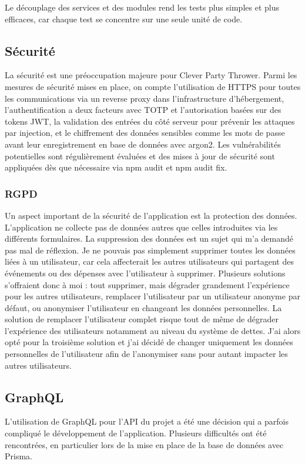 Le découplage des services et des modules rend les tests plus simples et plus efficaces, car chaque test se concentre sur une seule unité de code.

\subsection{Sécurité}\label{subsec:securite}
La sécurité est une préoccupation majeure pour Clever Party Thrower.
Parmi les mesures de sécurité mises en place, on compte l'utilisation de HTTPS pour toutes les communications via un reverse proxy dans l'infrastructure d'hébergement,
l'authentification a deux facteurs avec TOTP et l'autorisation basées sur des tokens JWT, la validation des entrées du côté serveur pour prévenir les attaques par injection,
et le chiffrement des données sensibles comme les mots de passe avant leur enregistrement en base de données avec argon2.
Les vulnérabilités potentielles sont régulièrement évaluées et des mises à jour de sécurité sont appliquées dès que nécessaire via npm audit et npm audit fix.

\subsubsection{RGPD}
Un aspect important de la sécurité de l'application est la protection des données.
L'application ne collecte pas de données autres que celles introduites via les différents formulaires.
La suppression des données est un sujet qui m'a demandé pas mal de réflexion.
Je ne pouvais pas simplement supprimer toutes les données liées à un utilisateur, car cela affecterait les autres utilisateurs qui partagent des événements ou des dépenses avec l'utilisateur à supprimer.
Plusieurs solutions s'offraient donc à moi : tout supprimer, mais dégrader grandement l'expérience pour les autres utilisateurs, remplacer l'utilisateur par un utilisateur anonyme par défaut, ou anonymiser l'utilisateur en changeant les données personnelles.
La solution de remplacer l'utilisateur complet risque tout de même de dégrader l'expérience des utilisateurs notamment au niveau du système de dettes.
J'ai alors opté pour la troisième solution et j'ai décidé de changer uniquement les données personnelles de l'utilisateur afin de l'anonymiser sans pour autant impacter les autres utilisateurs.

\subsection{GraphQL}\label{subsec:graphql}
L'utilisation de GraphQL pour l'API du projet a été une décision qui a parfois compliqué le développement de l'application.
Plusieurs difficultés ont été rencontrées, en particulier lors de la mise en place de la base de données avec Prisma.\\


